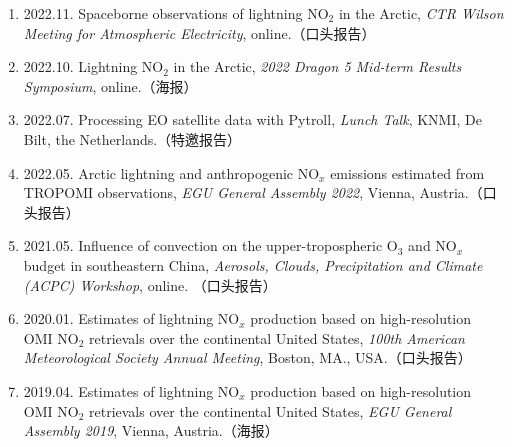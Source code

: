 \begin{enumerate}[label={(\arabic*)}, leftmargin=20pt, widest=0, itemindent=*, topsep=0pt, partopsep=0pt, parsep=0pt]

\item 2022.11. Spaceborne observations of lightning NO$_2$ in the Arctic,
                \emph{CTR Wilson Meeting for Atmospheric Electricity},
                online.（口头报告）

\item 2022.10. Lightning NO$_2$ in the Arctic,
                \emph{2022 Dragon 5 Mid-term Results Symposium},
                online.（海报）

\item 2022.07. Processing EO satellite data with Pytroll,
                \emph{Lunch Talk},
                KNMI, De Bilt, the Netherlands.（特邀报告）

\item 2022.05. Arctic lightning and anthropogenic NO$_x$ emissions estimated from TROPOMI observations,
                \emph{EGU General Assembly 2022},
                Vienna, Austria.（口头报告）

\item 2021.05. Influence of convection on the upper-tropospheric O$_3$ and NO$_x$ budget in southeastern China,
                \emph{Aerosols, Clouds, Precipitation and Climate (ACPC) Workshop},
                online. （口头报告）

\item 2020.01. Estimates of lightning NO$_x$ production based on high-resolution OMI NO$_2$ retrievals over the continental United States,
                \emph{100th American Meteorological Society Annual Meeting},
                Boston, MA., USA.（口头报告）

\item 2019.04. Estimates of lightning NO$_x$ production based on high-resolution OMI NO$_2$ retrievals over the continental United States,
                \emph{EGU General Assembly 2019},
                Vienna, Austria.（海报）

\end{enumerate}

